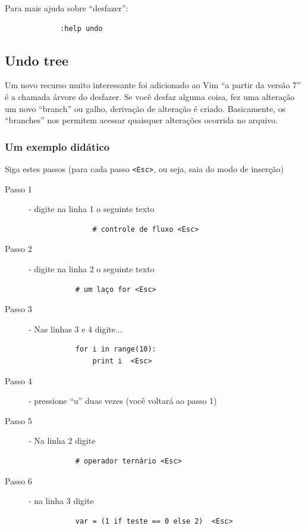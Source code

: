 \documentclass[10pt,a4paper,openany]{book}
\begin{document}
Para mais ajuda sobre ``desfazer'':

\begin{verbatim}
			 :help undo
\end{verbatim}

\subsection{Undo tree}
\label{Undo tree}

Um novo recurso muito interessante foi adicionado ao Vim ``a partir da
versão 7''  é a chamada árvore do desfazer.  Se
você desfaz alguma coisa, fez uma alteração um novo ``branch'' ou
galho, derivação de alteração é criado.  Basicamente, os ``branches''
nos permitem acessar quaisquer alterações ocorrida no arquivo.

\subsubsection{Um exemplo didático}
\label{Um exemplo didático}

Siga estes passos (para cada passo \verb|<Esc>|, ou seja, saia do modo
de inserção)


\begin{description}
\item [Passo 1] - digite na linha 1 o seguinte texto
\begin{verbatim}
			   # controle de fluxo <Esc>
\end{verbatim}

\item [Passo 2] - digite na linha 2 o seguinte texto
\begin{verbatim}
		   # um laço for <Esc>
\end{verbatim}

\item [Passo 3] - Nas linhas 3 e 4 digite...

\begin{verbatim}
		   for i in range(10):
			   print i  <Esc>
\end{verbatim}

\item [Passo 4] - pressione ``u'' duas vezes (você voltará ao passo 1)
\item [Passo 5] - Na linha 2 digite

\begin{verbatim}
		   # operador ternário <Esc>
\end{verbatim}

\item [Passo 6] - na linha 3 digite

\begin{verbatim}
		   var = (1 if teste == 0 else 2)  <Esc>
\end{verbatim}

\end{description}
\end{document}
